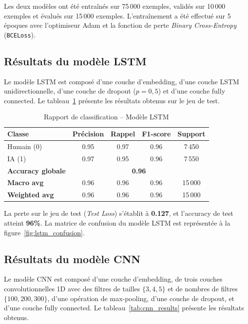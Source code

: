 Les deux modèles ont été entraînés sur 75\,000 exemples, validés sur 10\,000 exemples et
évalués sur 15\,000 exemples. L'entraînement a été effectué sur 5 époques avec l'optimiseur
Adam et la fonction de perte \textit{Binary Cross-Entropy} (\texttt{BCELoss}).

\subsection{Résultats du modèle LSTM}

Le modèle LSTM est composé d'une couche d'embedding, d'une couche LSTM unidirectionnelle,
d'une couche de dropout ($p=0{,}5$) et d'une couche fully connected. Le tableau~\ref{tab:lstm_results}
présente les résultats obtenus sur le jeu de test.

\begin{table}[h]
\centering
\label{tab:lstm_results}
\begin{tabular}{lcccc}
\hline
\textbf{Classe} & \textbf{Précision} & \textbf{Rappel} & \textbf{F1-score} & \textbf{Support} \\
\hline
Humain (0)      & 0.95 & 0.97 & 0.96 & 7\,450 \\
IA (1)          & 0.97 & 0.95 & 0.96 & 7\,550 \\
\hline
\textbf{Accuracy globale} & \multicolumn{4}{c}{\textbf{0.96}} \\
\textbf{Macro avg}        & 0.96 & 0.96 & 0.96 & 15\,000 \\
\textbf{Weighted avg}     & 0.96 & 0.96 & 0.96 & 15\,000 \\
\hline
\end{tabular}
\caption{Rapport de classification -- Modèle LSTM}
\end{table}

La perte sur le jeu de test (\textit{Test Loss}) s'établit à \textbf{0.127}, et l'accuracy de test
atteint \textbf{96\%}. La matrice de confusion du modèle LSTM est représentée à la
figure~\ref{fig:lstm_confusion}.

\subsection{Résultats du modèle CNN}

Le modèle CNN est composé d'une couche d'embedding, de trois couches convolutionnelles 1D
avec des filtres de tailles $\{3, 4, 5\}$ et de nombres de filtres $\{100, 200, 300\}$,
d'une opération de max-pooling, d'une couche de dropout, et d'une couche fully connected.
Le tableau~\ref{tab:cnn_results} présente les résultats obtenus.

